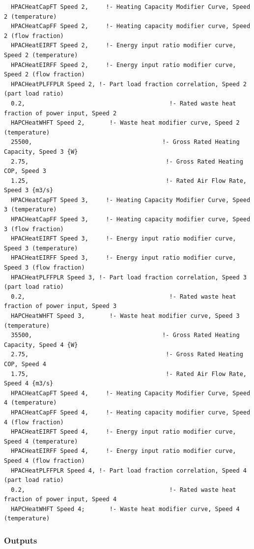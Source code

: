 \begin{lstlisting}
  HPACHeatCapFT Speed 2,     !- Heating Capacity Modifier Curve, Speed 2 (temperature)
  HPACHeatCapFF Speed 2,     !- Heating capacity modifier curve, Speed 2 (flow fraction)
  HPACHeatEIRFT Speed 2,     !- Energy input ratio modifier curve, Speed 2 (temperature)
  HPACHeatEIRFF Speed 2,     !- Energy input ratio modifier curve, Speed 2 (flow fraction)
  HPACHeatPLFFPLR Speed 2, !- Part load fraction correlation, Speed 2 (part load ratio)
  0.2,                                         !- Rated waste heat fraction of power input, Speed 2
  HAPCHeatWHFT Speed 2,       !- Waste heat modifier curve, Speed 2 (temperature)
  25500,                                     !- Gross Rated Heating Capacity, Speed 3 {W}
  2.75,                                       !- Gross Rated Heating COP, Speed 3
  1.25,                                       !- Rated Air Flow Rate, Speed 3 {m3/s}
  HPACHeatCapFT Speed 3,     !- Heating Capacity Modifier Curve, Speed 3 (temperature)
  HPACHeatCapFF Speed 3,     !- Heating capacity modifier curve, Speed 3 (flow fraction)
  HPACHeatEIRFT Speed 3,     !- Energy input ratio modifier curve, Speed 3 (temperature)
  HPACHeatEIRFF Speed 3,     !- Energy input ratio modifier curve, Speed 3 (flow fraction)
  HPACHeatPLFFPLR Speed 3, !- Part load fraction correlation, Speed 3 (part load ratio)
  0.2,                                         !- Rated waste heat fraction of power input, Speed 3
  HAPCHeatWHFT Speed 3,       !- Waste heat modifier curve, Speed 3 (temperature)
  35500,                                     !- Gross Rated Heating Capacity, Speed 4 {W}
  2.75,                                       !- Gross Rated Heating COP, Speed 4
  1.75,                                       !- Rated Air Flow Rate, Speed 4 {m3/s}
  HPACHeatCapFT Speed 4,     !- Heating Capacity Modifier Curve, Speed 4 (temperature)
  HPACHeatCapFF Speed 4,     !- Heating capacity modifier curve, Speed 4 (flow fraction)
  HPACHeatEIRFT Speed 4,     !- Energy input ratio modifier curve, Speed 4 (temperature)
  HPACHeatEIRFF Speed 4,     !- Energy input ratio modifier curve, Speed 4 (flow fraction)
  HPACHeatPLFFPLR Speed 4, !- Part load fraction correlation, Speed 4 (part load ratio)
  0.2,                                         !- Rated waste heat fraction of power input, Speed 4
  HAPCHeatWHFT Speed 4;       !- Waste heat modifier curve, Speed 4 (temperature)
\end{lstlisting}

\subsubsection{Outputs}\label{outputs-16}

